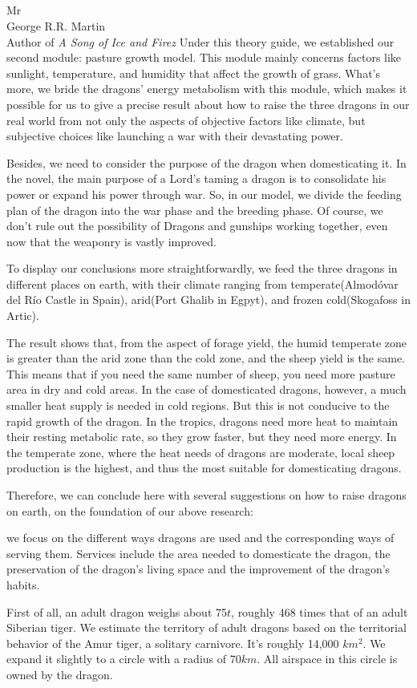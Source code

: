 \documentclass[12pt, letterpaper]{letter} %
\begin{document}
\begin{letter}{
    \quad\\
    \quad\\
    \quad\\
    \quad\\
	Mr\\
	George R.R. Martin \\
    Author of \textit{A Song of Ice and Firez}
}
Under this theory guide, we established our second module: pasture growth model. This module mainly concerns factors like sunlight, temperature, and humidity that affect the growth of grass. What's more, we bride the dragons' energy metabolism with this module, which makes it possible for us to give a precise result about how to raise the three dragons in our real world from not only the aspects of objective factors like climate, but subjective choices like launching a war with their devastating power.

Besides, we need to consider the purpose of the dragon when domesticating it. In the novel, the main purpose of a Lord's taming a dragon is to consolidate his power or expand his power through war. So, in our model, we divide the feeding plan of the dragon into the war phase and the breeding phase. Of course, we don't rule out the possibility of Dragons and gunships working together, even now that the weaponry is vastly improved.

To display our conclusions more straightforwardly, we feed the three dragons in different places on earth, with their climate ranging from temperate(Almodóvar del Río Castle in Spain), arid(Port Ghalib in Egpyt), and frozen cold(Skogafoss in Artic).

The result shows that, from the aspect of forage yield, the humid temperate zone is greater than the arid zone than the cold zone, and the sheep yield is the same. This means that if you need the same number of sheep, you need more pasture area in dry and cold areas. In the case of domesticated dragons, however, a much smaller heat supply is needed in cold regions. But this is not conducive to the rapid growth of the dragon. In the tropics, dragons need more heat to maintain their resting metabolic rate, so they grow faster, but they need more energy. In the temperate zone, where the heat needs of dragons are moderate, local sheep production is the highest, and thus the most suitable for domesticating dragons.

Therefore, we can conclude here with several suggestions on how to raise dragons on earth, on the foundation of our above research:

 we focus on the different ways dragons are used and the corresponding ways of serving them. Services include the area needed to domesticate the dragon, the preservation of the dragon's living space and the improvement of the dragon's habits.

 First of all, an adult dragon weighs about 75$t$, roughly 468 times that of an adult Siberian tiger. We estimate the territory of adult dragons based on the territorial behavior of the Amur tiger, a solitary carnivore. It's roughly 14,000 $km^{2}$. We expand it slightly to a circle with a radius of 70$km$. All airspace in this circle is owned by the dragon.


\end{letter}
\end{document}
